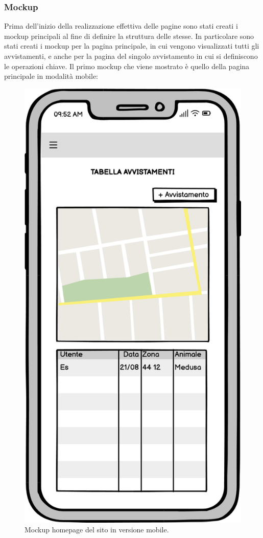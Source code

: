 \documentclass[a4paper,final,12pt]{report}
\begin{document}
\subsubsection{Mockup}
Prima dell'inizio della realizzazione effettiva delle pagine sono stati creati i mockup principali al fine di definire la struttura delle stesse. In particolare sono stati creati i mockup per la pagina principale, in cui vengono visualizzati tutti gli avvistamenti, e anche per la pagina del singolo avvistamento in cui si definiscono le operazioni chiave.
Il primo mockup che viene mostrato è quello della pagina principale in modalità mobile:
\begin{figure}[hbtp]
\centering
\includegraphics[scale=0.40]{img_concettuale/HomeMob.png}
\caption{Mockup homepage del sito in versione mobile.}
\end{figure}
\end{document}
